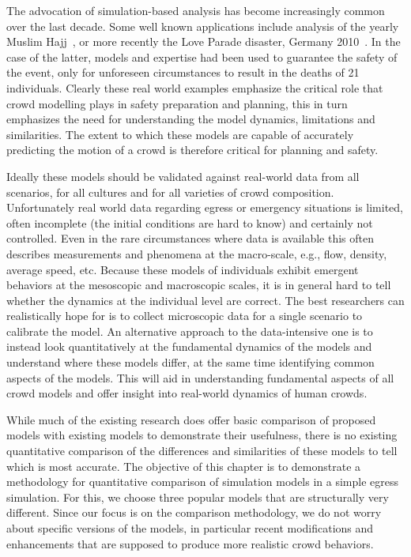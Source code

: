 The advocation of simulation-based analysis has become increasingly common over the last decade. Some well known applications include analysis of the yearly Muslim Hajj~\cite{Hughes:2003}, or more recently the Love Parade disaster, Germany 2010~\cite{Helbing:2012}. In the case of the latter, models and expertise had been used to guarantee the safety of the event, only for unforeseen circumstances to result in the deaths of 21 individuals. Clearly these real world examples emphasize the critical role that crowd modelling plays in safety preparation and planning, this in turn emphasizes the need for understanding the model dynamics, limitations and similarities. The extent to which these models are capable of accurately predicting the motion of a crowd is therefore critical for planning and safety.

Ideally these models should be validated against real-world data from all scenarios, for all cultures and for all varieties of crowd composition. Unfortunately real world data regarding egress or emergency situations is limited, often incomplete (the initial conditions are hard to know) and certainly not controlled. Even in the rare circumstances where data is available this often describes measurements and phenomena at the macro-scale, e.g., flow, density, average speed, etc. Because these models of individuals exhibit emergent behaviors at the mesoscopic and macroscopic scales, it is in general hard to tell whether the dynamics at the individual level are correct. The best researchers can realistically hope for is to collect microscopic data for a single scenario to calibrate the model. An alternative approach to the data-intensive one is to instead look quantitatively at the fundamental dynamics of the models and understand where these models differ, at the same time identifying common aspects of the models. This will aid in understanding fundamental aspects of all crowd models and offer insight into real-world dynamics of human crowds.

While much of the existing research does offer basic comparison of proposed models with existing models to demonstrate their usefulness, there is no existing quantitative comparison of the differences and similarities of these models to tell which is most accurate. The objective of this chapter is to demonstrate a methodology for quantitative comparison of simulation models in a simple egress simulation. For this, we choose three popular models that are structurally very different. Since our focus is on the comparison methodology, we do not worry about specific versions of the models, in particular recent modifications and enhancements that are supposed to produce more realistic crowd behaviors.

